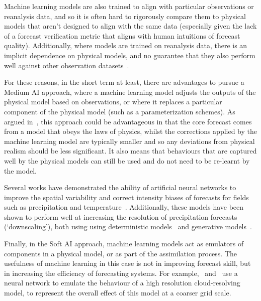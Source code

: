 \documentclass[../main.tex]{subfiles}
\begin{document}
Machine learning models are also trained to align with particular observations or reanalysis data, and so it is often hard to rigorously compare them to physical models that aren't designed to align with the same data (especially given the lack of a forecast verification metric that aligns with human intuitions of forecast quality). Additionally, where models are trained on reanalysis data, there is an implicit dependence on physical models, and no guarantee that they also perform well against other observation datasets~\citep{ramavajjala_verification_2023}.

For these reasons, in the short term at least, there are advantages to pursue a Medium AI approach, where a machine learning model adjusts the outputs of the physical model based on observations, or where it replaces a particular component of the physical model (such as a parameterization schemes). As argued in~\cite{watson_applying_2019}, this approach could be advantageous in that the core forecast comes from a model that obeys the laws of physics, whilst the corrections applied by the machine learning model are typically smaller and so any deviations from physical realism should be less significant. It also means that behaviours that are captured well by the physical models can still be used and do not need to be re-learnt by the model. 

Several works have demonstrated the ability of artificial neural networks to improve the spatial variability and correct intensity biases of forecasts for fields such as precipitation and temperature~\citep{rasp_neural_2018, steininger_convmos_2022, duncan_generative_2022}. Additionally, these models have been shown to perform well at increasing the resolution of precipitation forecasts (`downscaling'), both using using deterministic models~\citep{sha_deep-learning-based_2020, wang_deep_2021, vandal_intercomparison_2019, rampal_high-resolution_2022, mishra_sharma_resdeepd_2022} and generative models~\citep{harris_generative_2022, leinonen_stochastic_2020}. 

Finally, in the Soft AI approach, machine learning models act as emulators of components in a physical model, or as part of the assimilation process. The usefulness of machine learning in this case is not in improving forecast skill, but in increasing the efficiency of forecasting systems. For example,~\cite{krasnopolsky_using_2013} and~\cite{brenowitz_prognostic_2018} use a neural network to emulate the behaviour of a high resolution cloud-resolving model, to represent the overall effect of this model at a coarser grid scale.
\end{document}
